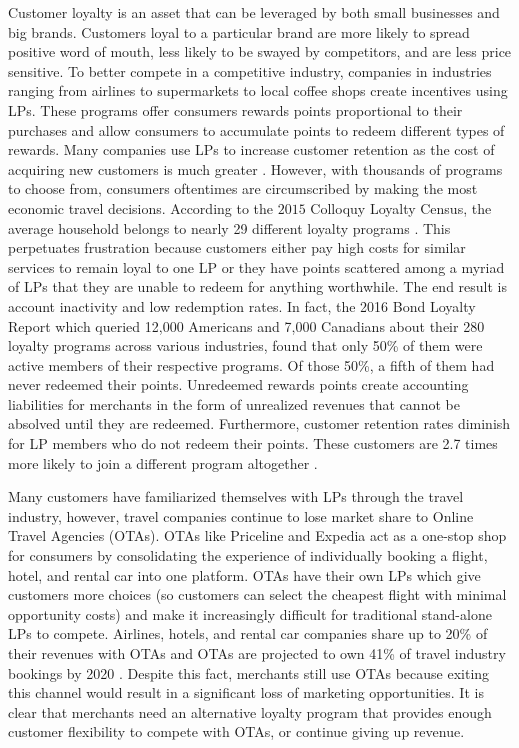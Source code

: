 Customer loyalty is an asset that can be leveraged by both small businesses and big brands. Customers loyal to a particular brand are more likely to spread positive word of mouth, less likely to be swayed by competitors, and are less price sensitive. To better compete in a competitive industry, companies in industries ranging from airlines to supermarkets to local coffee shops create incentives using LPs. These programs offer consumers rewards points proportional to their purchases and allow consumers to accumulate points to redeem different types of rewards. Many companies use LPs to increase customer retention as the cost of acquiring new customers is much greater \cite{VR16}. However, with thousands of programs to choose from, consumers oftentimes are circumscribed by making the most economic travel decisions. According to the $2015$ Colloquy Loyalty Census, the average household belongs to nearly 29 different loyalty programs \cite{CQ15}. This perpetuates frustration because customers either pay high costs for similar services to remain loyal to one LP or they have points scattered among a myriad of LPs that they are unable to redeem for anything worthwhile. The end result is account inactivity and low redemption rates. In fact, the 2016 Bond Loyalty Report which queried 12,000 Americans and 7,000 Canadians about their 280 loyalty programs across various industries, found that only 50\% of them were active members of their respective programs. Of those 50\%, a fifth of them had never redeemed their points. Unredeemed rewards points create accounting liabilities for merchants in the form of unrealized revenues that cannot be absolved until they are redeemed. Furthermore, customer retention rates diminish for LP members who do not redeem their points. These customers are 2.7 times more likely to join a different program altogether \cite{Bond16}. 

Many customers have familiarized themselves with LPs through the travel industry, however, travel companies continue to lose market share to Online Travel Agencies (OTAs). OTAs like Priceline and Expedia act as a one-stop shop for consumers by consolidating the experience of individually booking a flight, hotel, and rental car into one platform. OTAs have their own LPs which give customers more choices (so customers can select the cheapest flight with minimal opportunity costs) and make it increasingly difficult for traditional stand-alone LPs to compete. Airlines, hotels, and rental car companies share up to 20\% of their revenues with OTAs and OTAs are projected to own 41\% of travel industry bookings by 2020 \cite{OTA17}.  Despite this fact, merchants still use OTAs because exiting this channel would result in a significant loss of marketing opportunities.  It is clear that merchants need an alternative loyalty program that provides enough customer flexibility to compete with OTAs, or continue giving up revenue.

